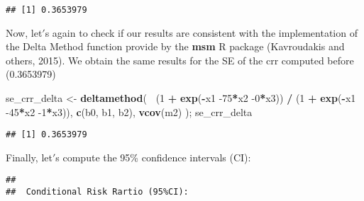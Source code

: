 \documentclass[]{article}
\newenvironment{Shaded}{\begin{snugshade}}{\end{snugshade}}
\newcommand{\CharTok}[1]{\textcolor[rgb]{0.31,0.60,0.02}{#1}}
\newcommand{\DecValTok}[1]{\textcolor[rgb]{0.00,0.00,0.81}{#1}}
\newcommand{\FloatTok}[1]{\textcolor[rgb]{0.00,0.00,0.81}{#1}}
\newcommand{\KeywordTok}[1]{\textcolor[rgb]{0.13,0.29,0.53}{\textbf{#1}}}
\newcommand{\NormalTok}[1]{#1}
\newcommand{\OperatorTok}[1]{\textcolor[rgb]{0.81,0.36,0.00}{\textbf{#1}}}
\newcommand{\StringTok}[1]{\textcolor[rgb]{0.31,0.60,0.02}{#1}}
\begin{document}
\begin{verbatim}
## [1] 0.3653979
\end{verbatim}

Now, let\('\)s again to check if our results are consistent with the
implementation of the Delta Method function provide by the \textbf{msm}
R package (Kavroudakis and others, 2015). We obtain the same results for
the SE of the crr computed before (0.3653979)

\begin{Shaded}
\begin{Highlighting}[]
\NormalTok{se_crr_delta <-}\StringTok{ }\KeywordTok{deltamethod}\NormalTok{( }\OperatorTok{~}\NormalTok{(}\DecValTok{1} \OperatorTok{+}\StringTok{ }\KeywordTok{exp}\NormalTok{(}\OperatorTok{-}\NormalTok{x1 }\DecValTok{-75}\OperatorTok{*}\NormalTok{x2 }\DecValTok{-0}\OperatorTok{*}\NormalTok{x3)) }\OperatorTok{/}\StringTok{ }\NormalTok{(}\DecValTok{1} \OperatorTok{+}\StringTok{ }\KeywordTok{exp}\NormalTok{(}\OperatorTok{-}\NormalTok{x1 }\DecValTok{-45}\OperatorTok{*}\NormalTok{x2 }\DecValTok{-1}\OperatorTok{*}\NormalTok{x3)), }
             \KeywordTok{c}\NormalTok{(b0, b1, b2), }
             \KeywordTok{vcov}\NormalTok{(m2)}
\NormalTok{             ); se_crr_delta}
\end{Highlighting}
\end{Shaded}

\begin{verbatim}
## [1] 0.3653979
\end{verbatim}

Finally, let\('\)s compute the 95\% confidence intervals (CI):

\begin{Shaded}
\end{Shaded}

\begin{verbatim}
## 
##  Conditional Risk Rartio (95%CI):
\end{verbatim}
\end{document}
